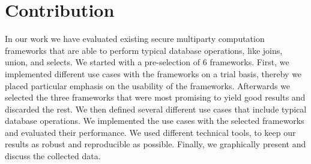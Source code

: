 \section{Contribution}
In our work we have evaluated existing secure multiparty computation frameworks that are able to perform typical database operations, like joins, union, and selects. We started with a pre-selection of 6 frameworks. First, we implemented different use cases with the frameworks on a trial basis, thereby we placed particular emphasis on the usability of the frameworks. Afterwards we selected the three frameworks that were most promising to yield good results and discarded the rest. We then defined several different use cases that include typical database operations. We implemented the use cases with the selected frameworks and evaluated their performance. We used different technical tools, to keep our results as robust and reproducible as possible. Finally, we graphically present and discuss the collected data. 

